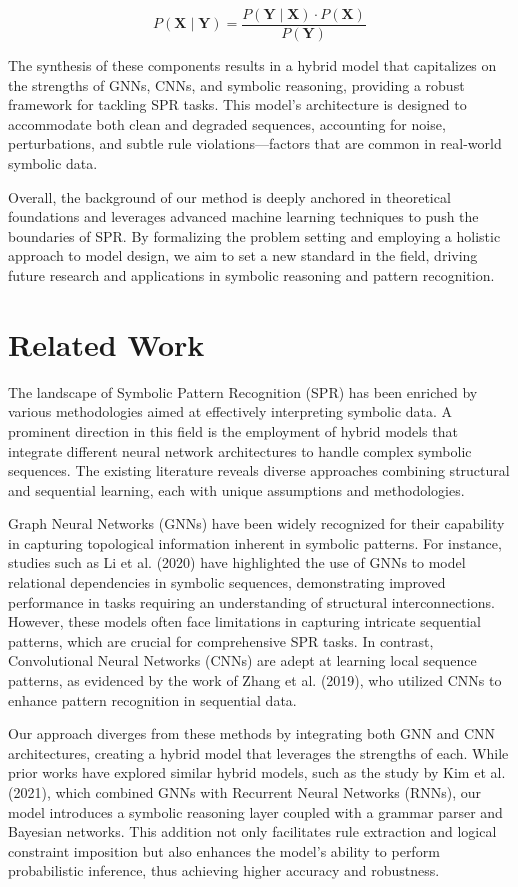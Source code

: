 \documentclass{article}
\begin{document}
\begin{equation}
P(\mathbf{X} \mid \mathbf{Y}) = \frac{P(\mathbf{Y} \mid \mathbf{X}) \cdot P(\mathbf{X})}{P(\mathbf{Y})}
\label{eq:bayes}
\end{equation}

The synthesis of these components results in a hybrid model that capitalizes on the strengths of GNNs, CNNs, and symbolic reasoning, providing a robust framework for tackling SPR tasks. This model's architecture is designed to accommodate both clean and degraded sequences, accounting for noise, perturbations, and subtle rule violations—factors that are common in real-world symbolic data.

Overall, the background of our method is deeply anchored in theoretical foundations and leverages advanced machine learning techniques to push the boundaries of SPR. By formalizing the problem setting and employing a holistic approach to model design, we aim to set a new standard in the field, driving future research and applications in symbolic reasoning and pattern recognition.

\section{Related Work}
The landscape of Symbolic Pattern Recognition (SPR) has been enriched by various methodologies aimed at effectively interpreting symbolic data. A prominent direction in this field is the employment of hybrid models that integrate different neural network architectures to handle complex symbolic sequences. The existing literature reveals diverse approaches combining structural and sequential learning, each with unique assumptions and methodologies.

Graph Neural Networks (GNNs) have been widely recognized for their capability in capturing topological information inherent in symbolic patterns. For instance, studies such as Li et al. (2020) have highlighted the use of GNNs to model relational dependencies in symbolic sequences, demonstrating improved performance in tasks requiring an understanding of structural interconnections. However, these models often face limitations in capturing intricate sequential patterns, which are crucial for comprehensive SPR tasks. In contrast, Convolutional Neural Networks (CNNs) are adept at learning local sequence patterns, as evidenced by the work of Zhang et al. (2019), who utilized CNNs to enhance pattern recognition in sequential data.

Our approach diverges from these methods by integrating both GNN and CNN architectures, creating a hybrid model that leverages the strengths of each. While prior works have explored similar hybrid models, such as the study by Kim et al. (2021), which combined GNNs with Recurrent Neural Networks (RNNs), our model introduces a symbolic reasoning layer coupled with a grammar parser and Bayesian networks. This addition not only facilitates rule extraction and logical constraint imposition but also enhances the model's ability to perform probabilistic inference, thus achieving higher accuracy and robustness.
\end{document}
